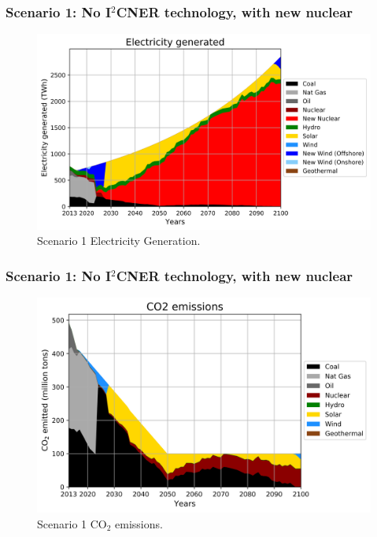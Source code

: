 \begin{frame}
  \frametitle{Scenario 1: No I$^2$CNER technology, with new nuclear}
  \begin{figure}[htbp!]
    \begin{center}
      \includegraphics[scale=0.5]{./images/conv_nuc_elc}
    \end{center}
          \caption{Scenario 1 Electricity Generation.}
    \label{s1e}
  \end{figure}
\end{frame}

\begin{frame}
  \frametitle{Scenario 1: No I$^2$CNER technology, with new nuclear}
  \begin{figure}[htbp!]
    \begin{center}
      \includegraphics[scale=0.5]{./images/conv_nuc_co2}
    \end{center}
          \caption{Scenario 1 CO$_2$ emissions.}
    \label{s1c}
  \end{figure}

\end{frame}
